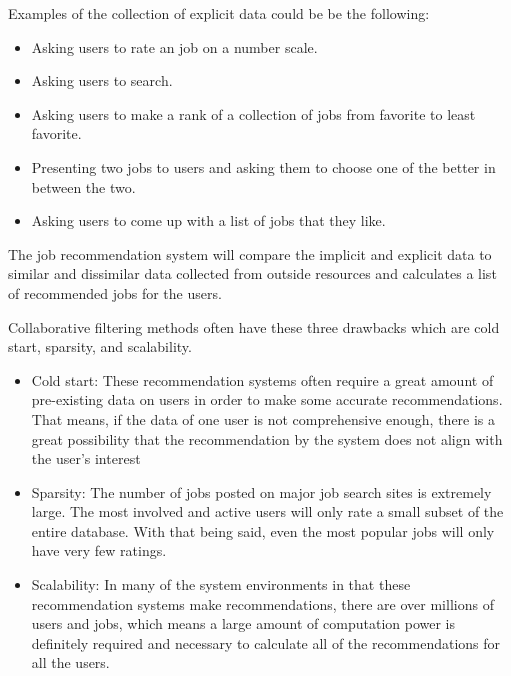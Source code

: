 \documentclass[sigconf]{acmart}
\begin{document}
\par Examples of the collection of explicit data could be be the following:
 
\begin{itemize}
  \item Asking users to rate an job on a number scale.
  \item Asking users to search.
  \item Asking users to make a rank of a collection of jobs from favorite to least favorite.
  \item Presenting two jobs to users and asking them to choose one of the better in between the two.
  \item Asking  users to come up with a list of jobs that they like.
\end{itemize}

\par The job recommendation system will compare the implicit and explicit data to similar and dissimilar data collected from outside resources and calculates a list of recommended jobs for the users. 

\par Collaborative filtering methods often have these three drawbacks which are cold start, sparsity, and scalability.

\begin{itemize}
  \item Cold start: These recommendation systems often require a great amount of pre-existing data on users in order to make some accurate recommendations. That means, if the data of one user is not comprehensive enough, there is a great possibility that the recommendation by the system does not align with the user's interest
  \item Sparsity: The number of jobs posted on major job search sites is extremely large. The most involved and active users will only rate a small subset of the entire database. With that being said, even the most popular jobs will only have very few ratings.
  \item Scalability: In many of the system environments in that these recommendation systems make recommendations, there are over millions of users and jobs, which means a large amount of computation power is definitely required and necessary to calculate all of the recommendations for all the users.

\end{itemize}
\end{document}
